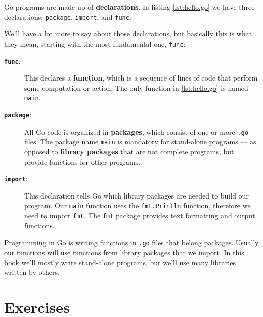 Go programs are made up of {\bf declarations}. In listing \ref{lst:hello.go}
we have three declarations: {\tt package}, {\tt import}, and {\tt func}.

We'll have a lot more to say about those declarations, but basically this is
what they mean, starting with the most fundamental one, {\tt func}:

\begin{description}

\item[\textbf{\texttt{func}}:] This declares a {\bf function}, which is a
sequence of lines of code that perform some computation or action. The only
function in \ref{lst:hello.go} is named {\tt main}.

\item[\textbf{\texttt{package}}:] All Go code is organized in {\bf packages},
which consist of one or more {\tt .go} files. The package name {\tt main} is
mandatory for stand-alone programs --- as opposed to {\bf library packages}
that are not complete programs, but provide functions for other programs.

\item[\textbf{\texttt{import}}:] This declaration tells Go which library
packages are needed to build our program. Our {\tt main} function uses the
{\tt fmt.Println} function, therefore we need to import {\tt fmt}. The
{\tt fmt} package provides text formatting and output functions.

\end{description}

Programming in Go is writing functions in {\tt .go} files that belong
packages. Usually our functions will use functions from library packages
that we import. In this book we'll mostly write stand-alone programs, but
we'll use many libraries written by others.


\section{Exercises}

